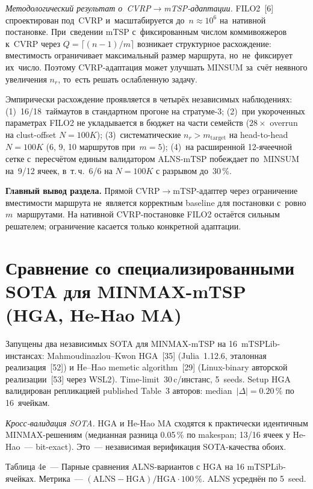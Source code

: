 \documentclass[a4paper,14pt]{extreport}
\begin{document}
\medskip
\textit{Методологический результат о~CVRP$\to$mTSP-адаптации.} FILO2~[6] спроектирован под~CVRP и~масштабируется до~$n\approx 10^6$ на~нативной постановке. При~сведении mTSP с~фиксированным числом коммивояжеров к~CVRP через $Q=\lceil(n{-}1)/m\rceil$ возникает структурное расхождение: вместимость ограничивает максимальный размер маршрута, но~не~фиксирует их~число. Поэтому CVRP-адаптация может улучшать MINSUM за~счёт неявного увеличения $n_r$, то~есть решать ослабленную задачу.

Эмпирически расхождение проявляется в четырёх независимых наблюдениях: (1)~16/18~таймаутов в стандартном прогоне на стратуме-3; (2)~при укороченных параметрах FILO2 не укладывается в бюджет на части семейств ($28\times$ overrun на clust-offset $N=100K$); (3)~систематические $n_r>m_\mathrm{target}$ на head-to-head $N=100K$ (6, 9, 10 маршрутов при~$m=5$); (4)~на расширенной 12-ячеечной сетке с~пересчётом единым валидатором ALNS-mTSP побеждает по~MINSUM на~9/12 ячеек, в~т.\,ч.\ 6/6 на $N=100K$ с разрывом до~30\,\%.

\textbf{Главный вывод раздела.} Прямой CVRP$\to$mTSP-адаптер через ограничение вместимости маршрута не~является корректным baseline для постановки с~ровно $m$~маршрутами. На нативной CVRP-постановке FILO2 остаётся сильным решателем; ограничение касается только конкретной адаптации.

\section{Сравнение со специализированными SOTA для MINMAX-mTSP (HGA, He-Hao MA)}\label{sec:hga}

Запущены два независимых SOTA для MINMAX-mTSP на 16~mTSPLib-инстансах: Mahmoudinazlou--Kwon HGA~[35] (Julia~1.12.6, эталонная реализация~[52]) и He--Hao memetic algorithm~[29] (Linux-binary авторской реализации~[53] через WSL2). Time-limit~30\,c/инстанс, 5~seeds. Setup HGA валидирован репликацией published Table~3 авторов: median~$|\Delta|=0.20\,\%$ по 16~ячейкам.

\textit{Кросс-валидация SOTA.} HGA и He-Hao MA сходятся к практически идентичным MINMAX-решениям (медианная разница 0.05\,\% по makespan; 13/16 ячеек у He-Hao~--- bit-exact). Это~--- независимая верификация SOTA-качества обоих.

\medskip
\noindent Таблица 4е~--- Парные сравнения ALNS-вариантов с HGA на 16 mTSPLib-ячейках. Метрика~--- $(\mathrm{ALNS}-\mathrm{HGA})/\mathrm{HGA}\cdot 100\,\%$. ALNS усреднён по 5~seed.
\end{document}

